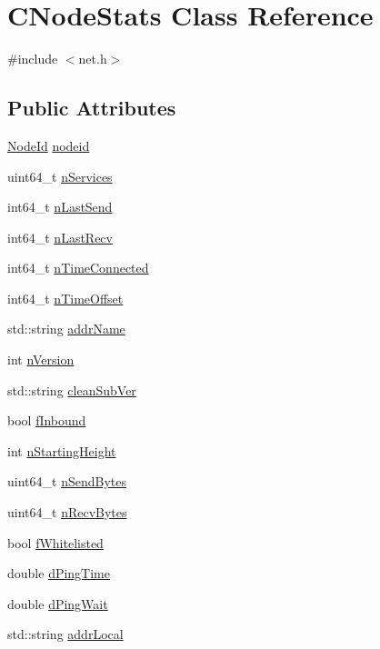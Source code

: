 \hypertarget{class_c_node_stats}{}\section{C\+Node\+Stats Class Reference}
\label{class_c_node_stats}


{\ttfamily \#include $<$net.\+h$>$}

\subsection*{Public Attributes}
\begin{DoxyCompactItemize}
\item 
\hyperlink{net_8h_a954d746a58632565552615fd0a4ee660}{Node\+Id} \hyperlink{class_c_node_stats_ad2bceab1a335d59f42af37178b72fee7}{nodeid}
\item 
uint64\+\_\+t \hyperlink{class_c_node_stats_a3c56fe96daccb9339314953d249dfa15}{n\+Services}
\item 
int64\+\_\+t \hyperlink{class_c_node_stats_adc88b64389f26227db58ed86058d2e1a}{n\+Last\+Send}
\item 
int64\+\_\+t \hyperlink{class_c_node_stats_a67b3cd5817ad20bfb2d9eb1583f1deb5}{n\+Last\+Recv}
\item 
int64\+\_\+t \hyperlink{class_c_node_stats_a3d5133369e51db3c45839c8a68c662d1}{n\+Time\+Connected}
\item 
int64\+\_\+t \hyperlink{class_c_node_stats_a905b33fdcf0443f25fa19ea4d10e8e59}{n\+Time\+Offset}
\item 
std\+::string \hyperlink{class_c_node_stats_a3299ecdae870c367fe657f3f59b27e43}{addr\+Name}
\item 
int \hyperlink{class_c_node_stats_ac8892d29d7c246e34e78fbc15ae77276}{n\+Version}
\item 
std\+::string \hyperlink{class_c_node_stats_ad733b840ac9a16a7eb6166ea4984d8a8}{clean\+Sub\+Ver}
\item 
bool \hyperlink{class_c_node_stats_a34627c46cac7bc2bfb3406c954522b49}{f\+Inbound}
\item 
int \hyperlink{class_c_node_stats_a86ff627e31f8ab881a8e11bb3acf4f19}{n\+Starting\+Height}
\item 
uint64\+\_\+t \hyperlink{class_c_node_stats_a3c70b0862e9ddd682380114016196137}{n\+Send\+Bytes}
\item 
uint64\+\_\+t \hyperlink{class_c_node_stats_a1aaec0f47a95487cbd709caf15889663}{n\+Recv\+Bytes}
\item 
bool \hyperlink{class_c_node_stats_a39afa3b5edc1747678667aae5acab3ec}{f\+Whitelisted}
\item 
double \hyperlink{class_c_node_stats_a535c198cbe3af112d4538f535e6618cd}{d\+Ping\+Time}
\item 
double \hyperlink{class_c_node_stats_a03a38f87940d04b321b9fb3102d0368d}{d\+Ping\+Wait}
\item 
std\+::string \hyperlink{class_c_node_stats_a027a5445a0c40e6489875e653be9c758}{addr\+Local}
\end{DoxyCompactItemize}


